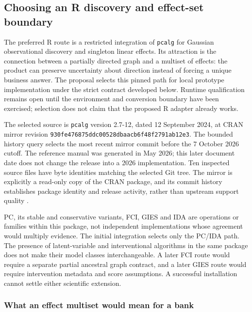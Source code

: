 \hypertarget{choosing-an-r-discovery-and-effect-set-boundary}{%
\subsection{Choosing an R discovery and effect-set
boundary}\label{choosing-an-r-discovery-and-effect-set-boundary}}

\label{exec13:pcalg-reuse}

The preferred R route is a restricted integration of \texttt{pcalg} for
Gaussian observational discovery and singleton linear effects. Its
attraction is the connection between a partially directed graph and a
multiset of effects: the product can preserve uncertainty about
direction instead of forcing a unique business answer. The proposal
selects this pinned path for local prototype implementation under the
strict contract developed below. Runtime qualification remains open
until the environment and conversion boundary have been exercised;
selection does not claim that the proposed R adapter already works.

The selected source is \texttt{pcalg} version 2.7-12, dated 12 September
2024, at CRAN mirror revision
\texttt{930fe476875ddc00528dbaacb6f48f2791ab12e3}. The bounded history
query selects the most recent mirror commit before the 7 October 2026
cutoff. The reference manual was generated in May 2026; this later
document date does not change the release into a 2026 implementation.
Ten inspected source files have byte identities matching the selected
Git tree. The mirror is explicitly a read-only copy of the CRAN package,
and its commit history establishes package identity and release
activity, rather than upstream support quality
\citep{exec13_pcalg,exec13_pcalg_reuse_primary}.

PC, its stable and conservative variants, FCI, GIES and IDA are
operations or families within this package, not independent
implementations whose agreement would multiply evidence. The initial
integration selects only the PC/IDA path. The presence of
latent-variable and interventional algorithms in the same package does
not make their model classes interchangeable. A later FCI route would
require a separate partial ancestral graph contract, and a later GIES
route would require intervention metadata and score assumptions. A
successful installation cannot settle either scientific extension.

\hypertarget{what-an-effect-multiset-would-mean-for-a-bank}{%
\subsubsection{What an effect multiset would mean for a
bank}\label{what-an-effect-multiset-would-mean-for-a-bank}}

